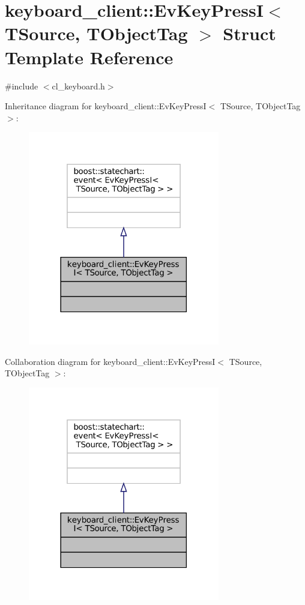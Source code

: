 \hypertarget{structkeyboard__client_1_1EvKeyPressI}{}\section{keyboard\+\_\+client\+:\+:Ev\+Key\+PressI$<$ T\+Source, T\+Object\+Tag $>$ Struct Template Reference}
\label{structkeyboard__client_1_1EvKeyPressI}


{\ttfamily \#include $<$cl\+\_\+keyboard.\+h$>$}



Inheritance diagram for keyboard\+\_\+client\+:\+:Ev\+Key\+PressI$<$ T\+Source, T\+Object\+Tag $>$\+:
\nopagebreak
\begin{figure}[H]
\begin{center}
\leavevmode
\includegraphics[width=237pt]{structkeyboard__client_1_1EvKeyPressI__inherit__graph}
\end{center}
\end{figure}


Collaboration diagram for keyboard\+\_\+client\+:\+:Ev\+Key\+PressI$<$ T\+Source, T\+Object\+Tag $>$\+:
\nopagebreak
\begin{figure}[H]
\begin{center}
\leavevmode
\includegraphics[width=237pt]{structkeyboard__client_1_1EvKeyPressI__coll__graph}
\end{center}
\end{figure}


